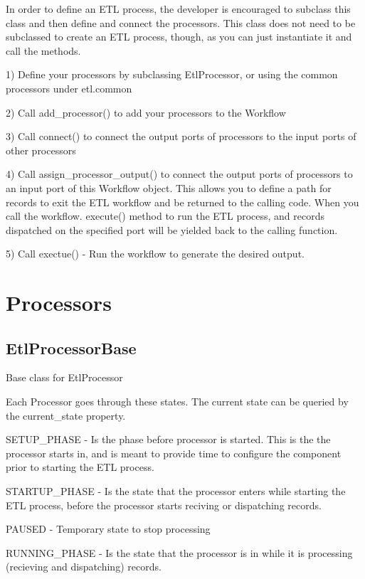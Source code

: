 In order to define an E\-T\-L process, the developer is encouraged to subclass this class and then define and connect the processors. This class does not need to be subclassed to create an E\-T\-L process, though, as you can just instantiate it and call the methods.

1) Define your processors by subclassing Etl\-Processor, or using the common processors under etl.\-common

2) Call add\-\_\-processor() to add your processors to the Workflow

3) Call connect() to connect the output ports of processors to the input ports of other processors

4) Call assign\-\_\-processor\-\_\-output() to connect the output ports of processors to an input port of this Workflow object. This allows you to define a path for records to exit the E\-T\-L workflow and be returned to the calling code. When you call the workflow. execute() method to run the E\-T\-L process, and records dispatched on the specified port will be yielded back to the calling function.

5) Call exectue() -\/ Run the workflow to generate the desired output.

\section*{Processors }

\subsection*{Etl\-Processor\-Base }

Base class for Etl\-Processor

Each Processor goes through these states. The current state can be queried by the current\-\_\-state property.

S\-E\-T\-U\-P\-\_\-\-P\-H\-A\-S\-E -\/ Is the phase before processor is started. This is the the processor starts in, and is meant to provide time to configure the component prior to starting the E\-T\-L process.

S\-T\-A\-R\-T\-U\-P\-\_\-\-P\-H\-A\-S\-E -\/ Is the state that the processor enters while starting the E\-T\-L process, before the processor starts reciving or dispatching records.

P\-A\-U\-S\-E\-D -\/ Temporary state to stop processing

R\-U\-N\-N\-I\-N\-G\-\_\-\-P\-H\-A\-S\-E -\/ Is the state that the processor is in while it is processing (recieving and dispatching) records.

